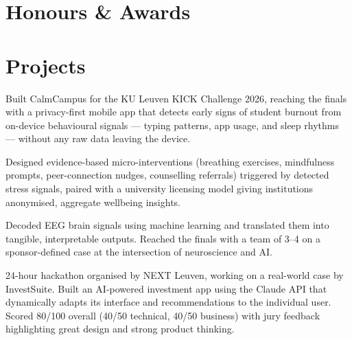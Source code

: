 \section{Honours \& Awards}


\vspace{4pt}

\section{Projects}

\begin{bullets}
    \item Built CalmCampus for the KU Leuven KICK Challenge 2026, reaching the finals with a privacy-first mobile app that detects early signs of student burnout from on-device behavioural signals --- typing patterns, app usage, and sleep rhythms --- without any raw data leaving the device.
    \item Designed evidence-based micro-interventions (breathing exercises, mindfulness prompts, peer-connection nudges, counselling referrals) triggered by detected stress signals, paired with a university licensing model giving institutions anonymised, aggregate wellbeing insights.
\end{bullets}

\begin{bullets}
    \item Decoded EEG brain signals using machine learning and translated them into tangible, interpretable outputs. Reached the finals with a team of 3--4 on a sponsor-defined case at the intersection of neuroscience and AI.
\end{bullets}

\begin{bullets}
    \item 24-hour hackathon organised by NEXT Leuven, working on a real-world case by InvestSuite. Built an AI-powered investment app using the Claude API that dynamically adapts its interface and recommendations to the individual user. Scored 80/100 overall (40/50 technical, 40/50 business) with jury feedback highlighting great design and strong product thinking.
\end{bullets}

